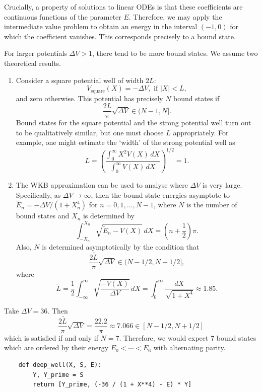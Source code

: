 \documentclass{article}
\begin{document}
Crucially, a property of solutions to linear ODEs is that these coefficients are continuous functions of the parameter \(E\). Therefore, we may apply the intermediate value problem to obtain an energy in the interval \((-1, 0)\) for which the coefficient vanishes. This corresponds precisely to a bound state.

For larger potentials \(\Delta V > 1\), there tend to be more bound states. We assume two theoretical results.

\begin{enumerate}
    \item Consider a square potential well of width \(2L\):
    \[ V_{\mathrm{square}}(X) = -\Delta V, \mbox{ if } |X| < L, \]
    and zero otherwise. This potential has precisely \(N\) bound states if 
    \[ \frac{2L}{\pi}\sqrt{\Delta V} \in (N-1, N]. \]
    Bound states for the square potential and the strong potential well turn out to be qualitatively similar, but one must choose \(L\) appropriately. For example, one might estimate the ‘width’ of the strong potential well as
    \[ L = \left(\frac{\int_0^\infty X^2V(X)\,dX}{\int_0^\infty V(X)\,dX}\right)^{1/2} = 1. \]
    \item The WKB approximation can be used to analyse where \(\Delta V\) is very large. Specifically, as \(\Delta V \to \infty\), then the bound state energies asymptote to \(\widetilde{E}_n = -\Delta V/(1+X^4_n)\) for \(n = 0, 1, \dots, N-1\), where \(N\) is the number of bound states and \(X_n\) is determined by
    \[ \int_{-X_n}^{X_n} \sqrt{\widetilde{E}_n - V(X)}\,dX =\left(n+\frac{1}{2}\right)\pi. \]
    Also, \(N\) is determined asymptotically by the condition that
    \[ \frac{2\widetilde{L}}{\pi}\sqrt{\Delta V} \in (N - 1/2, N + 1/2], \]
    where
    \[ \widetilde{L} = \frac{1}{2}\int_{-\infty}^\infty \sqrt{\frac{-V(X)}{\Delta V}}\,dX = \int_0^\infty \frac{dX}{\sqrt{1+X^4}} \approx 1.85. \]
\end{enumerate}

Take \(\Delta V = 36\). Then 
\[ \frac{2\widetilde{L}}{\pi}\sqrt{\Delta V} = \frac{22.2}{\pi} \approx 7.066 \in [N-1/2, N+1/2] \]
which is satisfied if and only if \(N = 7\). Therefore, we would expect \(7\) bound states which are ordered by their energy \(E_0 < \cdots < E_6\) with alternating parity.

\begin{verbatim}
    def deep_well(X, S, E):
        Y, Y_prime = S
        return [Y_prime, (-36 / (1 + X**4) - E) * Y]
\end{verbatim}
\end{document}

